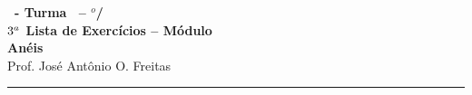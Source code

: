 \documentclass[12pt]{exam}
\begin{document}
    \begin{center}
    {\Large\bf \disciplina\ - Turma \turma\ -- \semestre$^{o}$/\ano} \\ \vspace{9pt} {\large\bf
        $3^a$ Lista de Exercícios -- Módulo \numeromodulo\\ Anéis}\\ \vspace{9pt} Prof. José Antônio O. Freitas
    \end{center}
    \hrule

    \vspace{.6cm}
\end{document}
